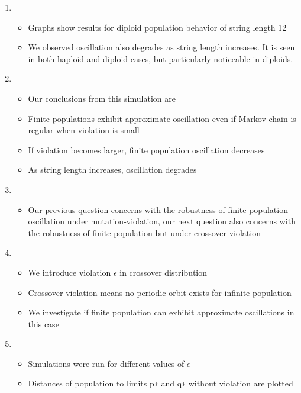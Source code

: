 \documentclass{article}
\begin{document}
\begin{enumerate}
\item
  \begin{itemize}
  \item Graphs show results for diploid population behavior of string length 12
  \item We observed oscillation also degrades as string length increases. 
  It is seen in both haploid and diploid cases, but particularly noticeable in diploids.  
  \end{itemize}
  
\item
  \begin{itemize}
  \item Our conclusions from this simulation are
  \item Finite populations exhibit approximate oscillation even if Markov chain is regular when violation is small
  \item If violation becomes larger, finite population oscillation decreases
  \item As string length increases, oscillation degrades
  \end{itemize}
  
\item
  \begin{itemize}
  \item Our previous question concerns with the robustness of finite population oscillation under mutation-violation, 
  our next question also concerns with the robustness of finite population but under crossover-violation  
  \end{itemize}

\item
  \begin{itemize}
  \item We introduce violation $\epsilon$ in crossover distribution
  \item Crossover-violation means no periodic orbit exists for infinite population
  \item We investigate if finite population can exhibit approximate oscillations in this case     
  \end{itemize}
  
\item
  \begin{itemize}
  \item Simulations were run for different values of $\epsilon$
  \item Distances of population to limits p∗ and q∗ without violation are plotted  
  \end{itemize}
  

\end{enumerate}
\end{document}
